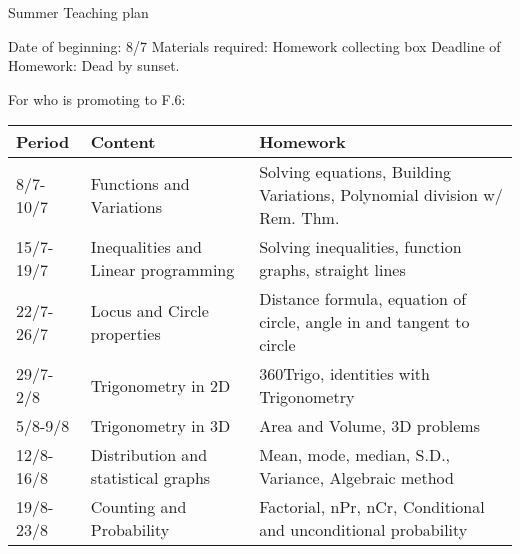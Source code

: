 \documentclass{article}
\begin{document}
    \begin{center}
        Summer Teaching plan
    \end{center}

    Date of beginning: 8/7
    Materials required: Homework collecting box
    Deadline of Homework: Dead by sunset.

    For who is promoting to F.6:
    \begin{center}
        \begin{tabular}{|m{2cm}|m{6cm}|m{6cm}|}
            \hline
            Period&Content&Homework\\
            \hline
            8/7-10/7&Functions and Variations&Solving equations, Building Variations, Polynomial division w/ Rem. Thm.\\
            \hline
            15/7-19/7&Inequalities and Linear programming&Solving inequalities, function graphs, straight lines\\
            \hline
            22/7-26/7&Locus and Circle properties&Distance formula, equation of circle, angle in and tangent to circle\\
            \hline
            29/7-2/8&Trigonometry in 2D&360Trigo, identities with Trigonometry\\
            \hline
            5/8-9/8&Trigonometry in 3D&Area and Volume, 3D problems\\
            \hline
            12/8-16/8&Distribution and statistical graphs&Mean, mode, median, S.D., Variance, Algebraic method\\
            \hline
            19/8-23/8&Counting and Probability& Factorial, nPr, nCr, Conditional and unconditional probability\\
            \hline
        \end{tabular}
    \end{center}
\end{document}
